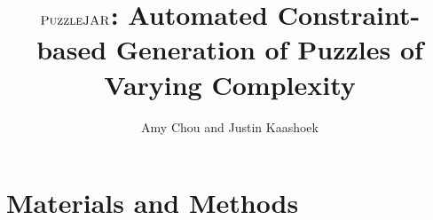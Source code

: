\documentclass[12pt]{article}
\begin{document}
\doublespacing


\title{$\textsc{PuzzleJAR}$: Automated Constraint-based Generation of Puzzles of Varying Complexity}
\author{Amy Chou and Justin Kaashoek}

\maketitle




\section{Materials and Methods}







\newpage


\end{document}
